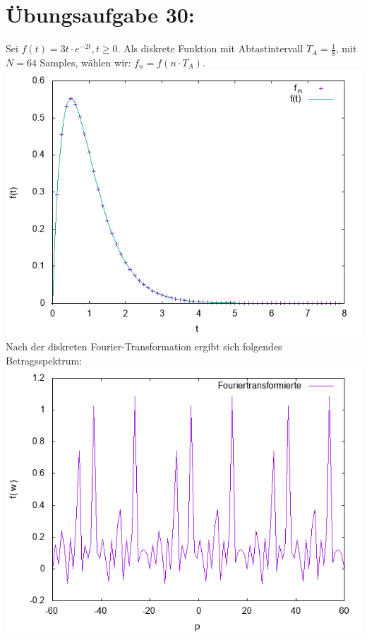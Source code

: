 	\section*{Übungsaufgabe 30:}
		Sei $f(t) = 3t\cdot e^{-2t}, t\ge 0$.
        Als diskrete Funktion mit Abtastintervall $T_A = \frac{1}{8}$, mit $N = 64$ Samples, wählen wir: $f_n = f(n \cdot T_A)$. \\
        \includegraphics[width=\textwidth]{A30_Fn.png} \\
        Nach der diskreten Fourier-Transformation ergibt sich folgendes Betragsspektrum: \\
        \includegraphics[width=\textwidth]{A30_Abs.png}
\newpage
